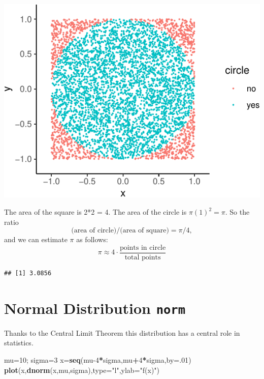 \documentclass[
]{book}
\newenvironment{Shaded}{\begin{snugshade}}{\end{snugshade}}
\newcommand{\AttributeTok}[1]{\textcolor[rgb]{0.13,0.29,0.53}{#1}}
\newcommand{\CommentTok}[1]{\textcolor[rgb]{0.56,0.35,0.01}{\textit{#1}}}
\newcommand{\DecValTok}[1]{\textcolor[rgb]{0.00,0.00,0.81}{#1}}
\newcommand{\FunctionTok}[1]{\textcolor[rgb]{0.13,0.29,0.53}{\textbf{#1}}}
\newcommand{\NormalTok}[1]{#1}
\newcommand{\OtherTok}[1]{\textcolor[rgb]{0.56,0.35,0.01}{#1}}
\newcommand{\SpecialCharTok}[1]{\textcolor[rgb]{0.81,0.36,0.00}{\textbf{#1}}}
\newcommand{\StringTok}[1]{\textcolor[rgb]{0.31,0.60,0.02}{#1}}
\theoremstyle{definition}
\theoremstyle{definition}
\theoremstyle{definition}
\theoremstyle{definition}
\theoremstyle{remark}
\begin{document}
\includegraphics{math340-notes_files/figure-latex/unnamed-chunk-193-1.pdf}

The area of the square is 2*2 = 4.
The area of the circle is \(\pi (1)^2 = \pi.\) So the ratio\\
\[\text{(area of circle)/(area of square)}=\pi/4,\]
and we can estimate \(\pi\) as follows:
\[\pi \approx 4\cdot \frac{\text{points in circle}}{\text{total points}}\]

\begin{Shaded}
\end{Shaded}

\begin{verbatim}
## [1] 3.0856
\end{verbatim}

\section{\texorpdfstring{Normal Distribution \texttt{norm}}{Normal Distribution norm}}\label{normalR}

Thanks to the Central Limit Theorem this distribution has a central role in statistics.

\begin{Shaded}
\begin{Highlighting}[]
\NormalTok{mu}\OtherTok{=}\DecValTok{10}\NormalTok{; sigma}\OtherTok{=}\DecValTok{3}
\NormalTok{x}\OtherTok{=}\FunctionTok{seq}\NormalTok{(mu}\DecValTok{{-}4}\SpecialCharTok{*}\NormalTok{sigma,mu}\SpecialCharTok{+}\DecValTok{4}\SpecialCharTok{*}\NormalTok{sigma,}\AttributeTok{by=}\NormalTok{.}\DecValTok{01}\NormalTok{)}
\FunctionTok{plot}\NormalTok{(x,}\FunctionTok{dnorm}\NormalTok{(x,mu,sigma),}\AttributeTok{type=}\StringTok{"l"}\NormalTok{,}\AttributeTok{ylab=}\StringTok{"f(x)"}\NormalTok{)}
\end{Highlighting}
\end{Shaded}
\end{document}
